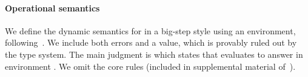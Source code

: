 {\paragraph{Operational semantics} We define the dynamic semantics for \lambdatc{}
in a big-step style using an environment, following~\cite{TF10}.
We include both errors and a \wrong{} value, which is provably ruled out by the
type system.
The main judgment is 
which states that \e{} evaluates to answer  in environment
\openv{}. We omit the core rules (included in supplemental material of~\cite{bonnaire2016practical}).


%
%
%

}
